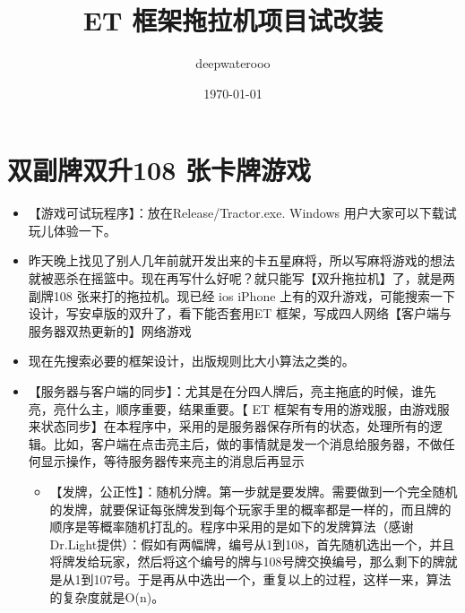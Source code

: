 \documentclass[9pt, b5paper]{article}
\author{deepwaterooo}
\date{\today}
\title{ET 框架拖拉机项目试改装}
\begin{document}
\maketitle
\tableofcontents


\section{双副牌双升108 张卡牌游戏}
\label{sec-1}
\begin{itemize}
\item 【游戏可试玩程序】：放在Release/Tractor.exe. Windows 用户大家可以下载试玩儿体验一下。
\item 昨天晚上找见了别人几年前就开发出来的卡五星麻将，所以写麻将游戏的想法就被恶杀在摇篮中。现在再写什么好呢？就只能写【双升拖拉机】了，就是两副牌108 张来打的拖拉机。现已经 ios iPhone 上有的双升游戏，可能搜索一下设计，写安卓版的双升了，看下能否套用ET 框架，写成四人网络【客户端与服务器双热更新的】网络游戏
\item 现在先搜索必要的框架设计，出版规则比大小算法之类的。
\item 【服务器与客户端的同步】：尤其是在分四人牌后，亮主拖底的时候，谁先亮，亮什么主，顺序重要，结果重要。【 ET 框架有专用的游戏服，由游戏服来状态同步】在本程序中，采用的是服务器保存所有的状态，处理所有的逻辑。比如，客户端在点击亮主后，做的事情就是发一个消息给服务器，不做任何显示操作，等待服务器传来亮主的消息后再显示
\begin{itemize}
\item 【发牌，公正性】：随机分牌。第一步就是要发牌。需要做到一个完全随机的发牌，就要保证每张牌发到每个玩家手里的概率都是一样的，而且牌的顺序是等概率随机打乱的。程序中采用的是如下的发牌算法（感谢Dr.Light提供）：假如有两幅牌，编号从1到108，首先随机选出一个，并且将牌发给玩家，然后将这个编号的牌与108号牌交换编号，那么剩下的牌就是从1到107号。于是再从中选出一个，重复以上的过程，这样一来，算法的复杂度就是O(n)。
\end{itemize}
\end{itemize}
\end{document}

